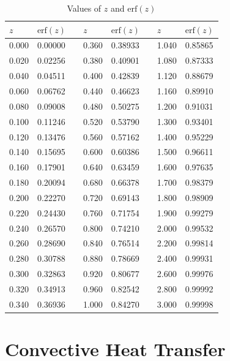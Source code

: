 \documentclass[12pt, a4paper]{article}
\numberwithin{equation}{subsection}
\begin{document}
\begin{table}[H]
    \centering
    \begin{tabularx}{\textwidth}{X X c|X X c|X X}
        \toprule
        $z$ & $\text{erf}(z)$ & & $z$ & $\text{erf}(z)$ & & $z$ & $\text{erf}(z)$ \\
        \midrule
        0.000 & 0.00000 & & 0.360 & 0.38933 & & 1.040 & 0.85865 \\
        0.020 & 0.02256 & & 0.380 & 0.40901 & & 1.080 & 0.87333 \\
        0.040 & 0.04511 & & 0.400 & 0.42839 & & 1.120 & 0.88679 \\
        0.060 & 0.06762 & & 0.440 & 0.46623 & & 1.160 & 0.89910 \\
        0.080 & 0.09008 & & 0.480 & 0.50275 & & 1.200 & 0.91031 \\
        0.100 & 0.11246 & & 0.520 & 0.53790 & & 1.300 & 0.93401 \\
        0.120 & 0.13476 & & 0.560 & 0.57162 & & 1.400 & 0.95229 \\
        0.140 & 0.15695 & & 0.600 & 0.60386 & & 1.500 & 0.96611 \\
        0.160 & 0.17901 & & 0.640 & 0.63459 & & 1.600 & 0.97635 \\
        0.180 & 0.20094 & & 0.680 & 0.66378 & & 1.700 & 0.98379 \\
        0.200 & 0.22270 & & 0.720 & 0.69143 & & 1.800 & 0.98909 \\
        0.220 & 0.24430 & & 0.760 & 0.71754 & & 1.900 & 0.99279 \\
        0.240 & 0.26570 & & 0.800 & 0.74210 & & 2.000 & 0.99532 \\
        0.260 & 0.28690 & & 0.840 & 0.76514 & & 2.200 & 0.99814 \\
        0.280 & 0.30788 & & 0.880 & 0.78669 & & 2.400 & 0.99931 \\
        0.300 & 0.32863 & & 0.920 & 0.80677 & & 2.600 & 0.99976 \\
        0.320 & 0.34913 & & 0.960 & 0.82542 & & 2.800 & 0.99992 \\
        0.340 & 0.36936 & & 1.000 & 0.84270 & & 3.000 & 0.99998 \\
        \bottomrule
    \end{tabularx}
    \caption{Values of $z$ and $\text{erf}(z)$}
    \label{tab:erf}
\end{table}

\newpage
\section{Convective Heat Transfer}
\end{document}

